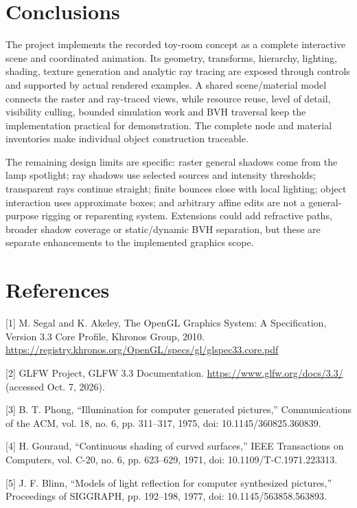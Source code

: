 \documentclass[12pt,a4paper]{article}
\begin{document}
\section*{Conclusions}
The project implements the recorded toy-room concept as a complete interactive scene and coordinated animation. Its geometry, transforms, hierarchy, lighting, shading, texture generation and analytic ray tracing are exposed through controls and supported by actual rendered examples. A shared scene/material model connects the raster and ray-traced views, while resource reuse, level of detail, visibility culling, bounded simulation work and BVH traversal keep the implementation practical for demonstration. The complete node and material inventories make individual object construction traceable.

The remaining design limits are specific: raster general shadows come from the lamp spotlight; ray shadows use selected sources and intensity thresholds; transparent rays continue straight; finite bounces close with local lighting; object interaction uses approximate boxes; and arbitrary affine edits are not a general-purpose rigging or reparenting system. Extensions could add refractive paths, broader shadow coverage or static/dynamic BVH separation, but these are separate enhancements to the implemented graphics scope.

\section*{References}
[1] M. Segal and K. Akeley, The OpenGL Graphics System: A Specification, Version 3.3 Core Profile, Khronos Group, 2010. \url{https://registry.khronos.org/OpenGL/specs/gl/glspec33.core.pdf}

[2] GLFW Project, GLFW 3.3 Documentation. \url{https://www.glfw.org/docs/3.3/} (accessed Oct. 7, 2026).

[3] B. T. Phong, ``Illumination for computer generated pictures,'' Communications of the ACM, vol. 18, no. 6, pp. 311--317, 1975, doi: 10.1145/360825.360839.

[4] H. Gouraud, ``Continuous shading of curved surfaces,'' IEEE Transactions on Computers, vol. C-20, no. 6, pp. 623--629, 1971, doi: 10.1109/T-C.1971.223313.

[5] J. F. Blinn, ``Models of light reflection for computer synthesized pictures,'' Proceedings of SIGGRAPH, pp. 192--198, 1977, doi: 10.1145/563858.563893.
\end{document}
